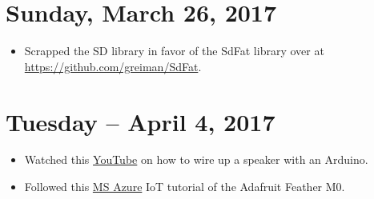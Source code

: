 \documentclass[12pt]{article}
\begin{document}
\section{Sunday, March 26, 2017}
\begin{itemize}
\item Scrapped the SD library in favor of the SdFat library over at \url{https://github.com/greiman/SdFat}.
\end{itemize}


\section{Tuesday -- April 4, 2017}
\begin{itemize}
\item Watched this \href{https://www.youtube.com/watch?v=wLlsVXBaQLQ}{YouTube} on how to wire up a speaker with an Arduino.
\item Followed this \href{https://docs.microsoft.com/en-us/azure/iot-hub/iot-hub-adafruit-feather-m0-wifi-kit-arduino-get-started}{MS Azure} IoT tutorial of the Adafruit Feather M0.
\end{itemize}
\end{document}
